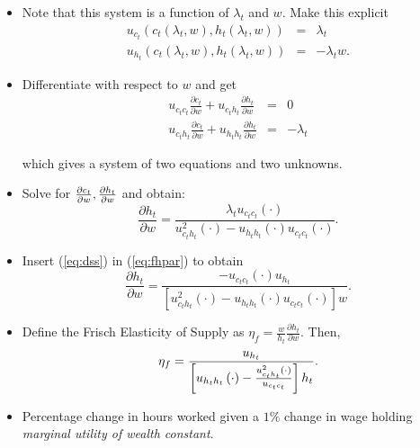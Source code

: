 \documentclass[11pt]{article}
\begin{document}
\begin{itemize}
\item Note that this system is a function of $\lambda _{t}$ and $w$. Make this explicit
\begin{eqnarray}
u_{c_{t}}\left( c_{t}\left( \lambda _{t},w\right) ,h_{t}\left( \lambda
_{t},w\right) \right)  &=&\lambda _{t} \nonumber \\
u_{h_{t}}\left( c_{t}\left( \lambda _{t},w\right) ,h_{t}\left( \lambda
_{t},w\right) \right)  &=&-\lambda _{t}w \label{eq:dss}.
\end{eqnarray}

\item Differentiate with respect to $w$ and get%
\begin{eqnarray}
u_{c_{t}c_{t}}\frac{\partial c_{t}}{\partial w}+u_{c_{t}h_{t}}\frac{\partial
h_{t}}{\partial w} &=&0 \\
u_{c_{t}h_{t}}\frac{\partial c_{t}}{\partial w}+u_{h_{t}h_{t}}\frac{\partial
h_{t}}{\partial w} &=&-\lambda _{t}
\end{eqnarray}

which gives a system of two equations and two unknowns.

\item Solve for $\frac{\partial c_{t}}{\partial w},\frac{\partial h_{t}}{%
\partial w}$ and obtain:%
\begin{equation}
\frac{\partial h_{t}}{\partial w}=\frac{\lambda _{t}u_{c_{t}c_{t}}\left(
\cdot \right) }{u_{c_{t}h_{t}}^{2}\left( \cdot \right) -u_{h_{t}h_{t}}\left(
\cdot \right) u_{c_{t}c_{t}}\left( \cdot \right) }. \label{eq:fhpar}
\end{equation}
\end{itemize}

\begin{itemize}
\item Insert (\ref{eq:dss}) in (\ref{eq:fhpar}) to obtain
\begin{equation}
\frac{\partial h_{t}}{\partial w}=\frac{-u_{c_{t}c_{t}}\left( \cdot \right)
u_{h_{t}}}{\left[ u_{c_{t}h_{t}}^{2}\left( \cdot \right)
-u_{h_{t}h_{t}}\left( \cdot \right) u_{c_{t}c_{t}}\left( \cdot \right) %
\right] w}.
\end{equation}

\item Define the Frisch Elasticity of Supply as $\eta _{f}=\frac{w}{h_{t}}%
\frac{\partial h_{t}}{\partial w}$. Then,%
\begin{equation}
\eta _{f}=\frac{u_{h_{t}}}{\left[ u_{h_{t}h_{t}}\left( \cdot \right) -\frac{%
u_{c_{t}h_{t}}^{2}\left( \cdot \right) }{u_{c_{t}c_{t}}}\right] h_{t}}.
\end{equation}

\item Percentage change in hours worked given a $1\%$ change in wage holding 
\textit{marginal utility of wealth constant}.\textit{\ }
\end{itemize}
\end{document}
